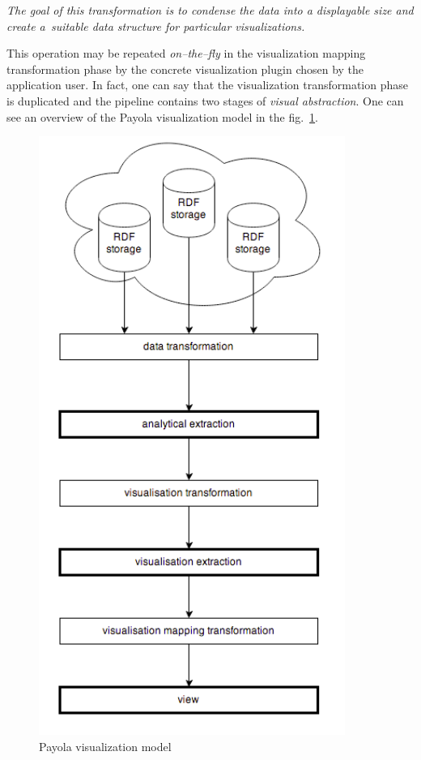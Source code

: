 \emph{The goal of this transformation is to condense the data into a displayable size and create
a~suitable data structure for particular visualizations.}

This operation may be repeated \emph{on--the--fly} in the visualization mapping transformation
phase by the concrete visualization plugin chosen by the application user. In fact, one can
say that the visualization transformation phase is duplicated and the pipeline contains two
stages of \emph{visual abstraction}. One can see an overview of the Payola 
visualization model in the fig.~\ref{fig:payola_model}.

\begin{figure}
	\centering
	\includegraphics[width=100mm]{img/payola_model.png}
	\caption{Payola visualization model}
	\label{fig:payola_model}
\end{figure}

